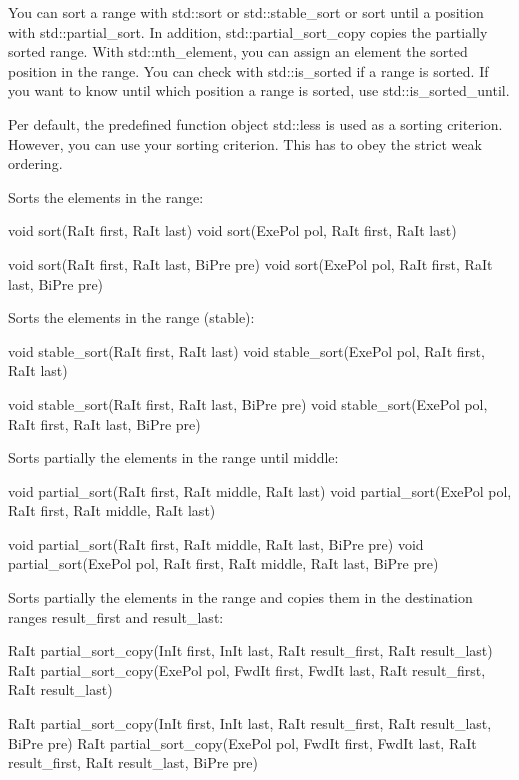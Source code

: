 You can sort a range with std::sort or std::stable\_sort or sort until a position with std::partial\_sort. In addition, std::partial\_sort\_copy copies the partially sorted range. With std::nth\_element, you can assign an element the sorted position in the range. You can check with std::is\_sorted if a range is sorted. If you want to know until which position a range is sorted, use std::is\_sorted\_until.

Per default, the predefined function object std::less is used as a sorting criterion. However, you can use your sorting criterion. This has to obey the strict weak ordering.

Sorts the elements in the range:

\begin{cpp}
void sort(RaIt first, RaIt last)
void sort(ExePol pol, RaIt first, RaIt last)

void sort(RaIt first, RaIt last, BiPre pre)
void sort(ExePol pol, RaIt first, RaIt last, BiPre pre)
\end{cpp}

Sorts the elements in the range (stable):

\begin{cpp}
void stable_sort(RaIt first, RaIt last)
void stable_sort(ExePol pol, RaIt first, RaIt last)

void stable_sort(RaIt first, RaIt last, BiPre pre)
void stable_sort(ExePol pol, RaIt first, RaIt last, BiPre pre)
\end{cpp}

Sorts partially the elements in the range until middle:

\begin{cpp}
void partial_sort(RaIt first, RaIt middle, RaIt last)
void partial_sort(ExePol pol, RaIt first, RaIt middle, RaIt last)

void partial_sort(RaIt first, RaIt middle, RaIt last, BiPre pre)
void partial_sort(ExePol pol, RaIt first, RaIt middle, RaIt last, BiPre pre)
\end{cpp}

Sorts partially the elements in the range and copies them in the destination ranges result\_first and result\_last:

\begin{cpp}
RaIt partial_sort_copy(InIt first, InIt last,
					   RaIt result_first, RaIt result_last)
RaIt partial_sort_copy(ExePol pol, FwdIt first, FwdIt last,
					   RaIt result_first, RaIt result_last)

RaIt partial_sort_copy(InIt first, InIt last,
					   RaIt result_first, RaIt result_last, BiPre pre)
RaIt partial_sort_copy(ExePol pol, FwdIt first, FwdIt last,
					   RaIt result_first, RaIt result_last, BiPre pre)
\end{cpp}

